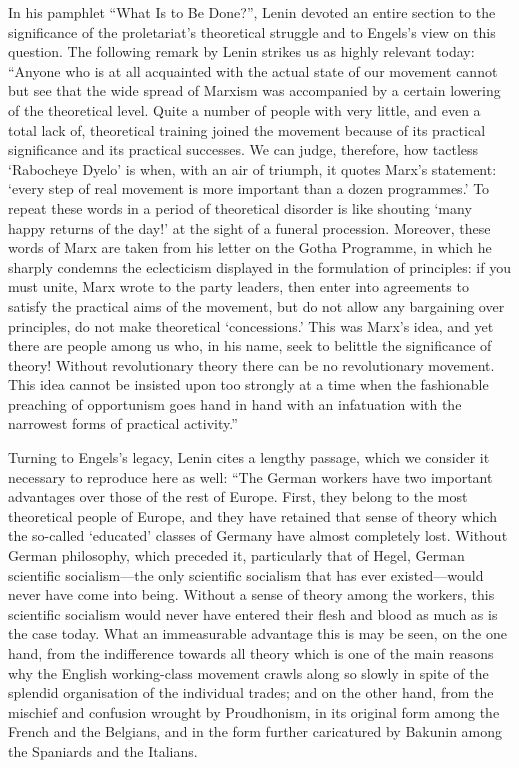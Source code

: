 \documentclass[12pt,a4paper,openany]{book}
\begin{document}
In his pamphlet “What Is to Be Done?”, Lenin devoted an entire section to the significance of the proletariat’s theoretical struggle and to Engels’s view on this question. The following remark by Lenin strikes us as highly relevant today: “Anyone who is at all acquainted with the actual state of our movement cannot but see that the wide spread of Marxism was accompanied by a certain lowering of the theoretical level. Quite a number of people with very little, and even a total lack of, theoretical training joined the movement because of its practical significance and its practical successes. We can judge, therefore, how tactless ‘Rabocheye Dyelo’ is when, with an air of triumph, it quotes Marx’s statement: ‘every step of real movement is more important than a dozen programmes.’ To repeat these words in a period of theoretical disorder is like shouting ‘many happy returns of the day!’ at the sight of a funeral procession. Moreover, these words of Marx are taken from his letter on the Gotha Programme, in which he sharply condemns the eclecticism displayed in the formulation of principles: if you must unite, Marx wrote to the party leaders, then enter into agreements to satisfy the practical aims of the movement, but do not allow any bargaining over principles, do not make theoretical ‘concessions.’ This was Marx’s idea, and yet there are people among us who, in his name, seek to belittle the significance of theory! Without revolutionary theory there can be no revolutionary movement. This idea cannot be insisted upon too strongly at a time when the fashionable preaching of opportunism goes hand in hand with an infatuation with the narrowest forms of practical activity.”

Turning to Engels’s legacy, Lenin cites a lengthy passage, which we consider it necessary to reproduce here as well: “The German workers have two important advantages over those of the rest of Europe. First, they belong to the most theoretical people of Europe, and they have retained that sense of theory which the so-called ‘educated’ classes of Germany have almost completely lost. Without German philosophy, which preceded it, particularly that of Hegel, German scientific socialism—the only scientific socialism that has ever existed—would never have come into being. Without a sense of theory among the workers, this scientific socialism would never have entered their flesh and blood as much as is the case today. What an immeasurable advantage this is may be seen, on the one hand, from the indifference towards all theory which is one of the main reasons why the English working-class movement crawls along so slowly in spite of the splendid organisation of the individual trades; and on the other hand, from the mischief and confusion wrought by Proudhonism, in its original form among the French and the Belgians, and in the form further caricatured by Bakunin among the Spaniards and the Italians.
\end{document}
